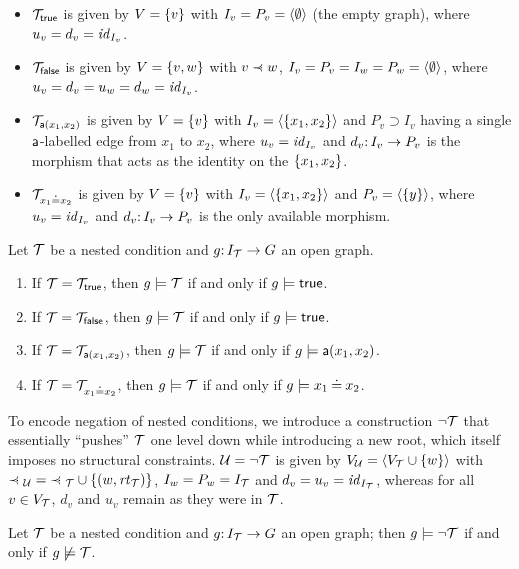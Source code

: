 \begin{itemize}
\item ${\mathcal{T}}_{\mathsf{true}}$ is given by $V=\{{v}\}$ with $I_v=P_v=\langle \emptyset\rangle$ (the empty graph), where $u_v=d_v={\mathit{id}}_{I_v}$.
\item ${\mathcal{T}}_{\mathsf{false}}$ is given by $V=\{{v,w}\}$ with $v\parentof w$, $I_v=P_v=I_w=P_w=\langle \emptyset\rangle$, where $u_v=d_v=u_w=d_w={\mathit{id}}_{I_v}$.
\item ${\mathcal{T}}_{\mathsf{a}(x_1,x_2)}$ is given by $V=\{{v}\}$ with $I_v=\langle \{{x_1,x_2}\}\rangle$ and $P_v\supset I_v$ having a single $\mathsf{a}$-labelled edge from $x_1$ to $x_2$, where $u_v={\mathit{id}}_{I_v}$ and $d_v{:}\, I_v\rightarrow P_v$ is the morphism that acts as the identity on the $\{{x_1,x_2}\}$.
\item ${\mathcal{T}}_{x_1\mathbin{\doteq} x_2}$ is given by $V=\{{v}\}$ with $I_v=\langle \{{x_1,x_2}\}\rangle$ and $P_v=\langle \{{y}\}\rangle$, where $u_v={\mathit{id}}_{I_v}$ and $d_v{:}\, I_v\rightarrow P_v$ is the only available morphism.
\end{itemize}

\begin{proposition}
Let ${\mathcal{T}}$ be a nested condition and $g{:}\, I_{\mathcal{T}}\rightarrow G$ an open graph.
\begin{enumerate}
\item If ${\mathcal{T}}={\mathcal{T}}_{\mathsf{true}}$, then $g\models {\mathcal{T}}$ if and only if $g\models\mathsf{true}$.
\item If ${\mathcal{T}}={\mathcal{T}}_{\mathsf{false}}$, then $g\models {\mathcal{T}}$ if and only if $g\models\mathsf{true}$.
\item If ${\mathcal{T}}={\mathcal{T}}_{\mathsf{a}(x_1,x_2)}$, then $g\models {\mathcal{T}}$ if and only if $g\models\mathsf{a}(x_1,x_2)$.
\item If ${\mathcal{T}}={\mathcal{T}}_{x_1\mathbin{\doteq} x_2}$, then $g\models {\mathcal{T}}$ if and only if $g\models x_1\mathbin{\doteq} x_2$.
\end{enumerate}
\end{proposition}

To encode negation of nested conditions, we introduce a construction $\neg{\mathcal{T}}$ that essentially ``pushes'' ${\mathcal{T}}$ one level down while introducing a new root, which itself imposes no structural constraints. ${\mathcal{U}}=\neg{\mathcal{T}}$ is given by $V_{\mathcal{U}}=\langle V_{\mathcal{T}}\cup\{{w}\}\rangle$ with ${\parentof_\cU}= {\parentof_\cT}\cup \setof{(w,\rtof\cT)}$, $I_w=P_w=I_{\mathcal{T}}$ and $d_v=u_v={\mathit{id}}_{I_{\mathcal{T}}}$, whereas for all $v\in V_{\mathcal{T}}$, $d_v$ and $u_v$ remain as they were in ${\mathcal{T}}$.

\begin{proposition}
Let ${\mathcal{T}}$ be a nested condition and $g{:}\, I_{\mathcal{T}}\rightarrow G$ an open graph; then $g\models \neg{\mathcal{T}}$ if and only if $g\not\models{\mathcal{T}}$.
\end{proposition}

